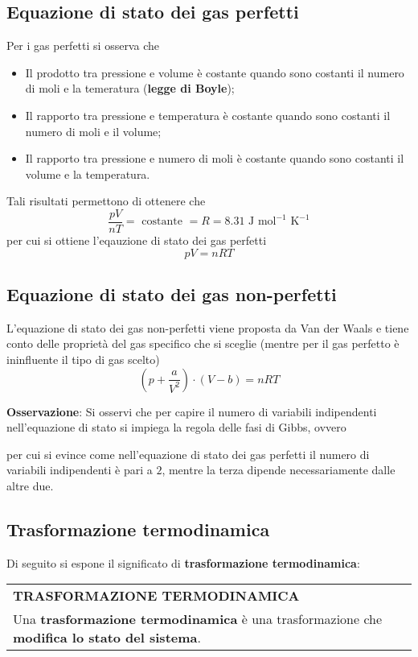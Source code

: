 \documentclass[a4paper]{extarticle}
\renewcommand\arraystretch{}
\begin{document}
\subsection{Equazione di stato dei gas perfetti}
Per i gas perfetti si osserva che
\begin{itemize}
  \item Il prodotto tra pressione e volume è costante quando sono costanti il numero di moli e la temeratura (\textbf{legge di Boyle});
  \item Il rapporto tra pressione e temperatura è costante quando sono costanti il numero di moli e il volume;
  \item Il rapporto tra pressione e numero di moli è costante quando sono costanti il volume e la temperatura.
\end{itemize}
Tali risultati permettono di ottenere che
\[\frac{p V}{n T} = \text{ costante } = R = 8.31 \text{ J mol}^{-1} \text{ K}^{-1}\]
per cui si ottiene l'eqauzione di stato dei gas perfetti
\[\boxed{pV=nRT}\]

\vspace{1em}
\subsection{Equazione di stato dei gas non-perfetti}
L'equazione di stato dei gas non-perfetti viene proposta da Van der Waals e tiene conto delle proprietà del gas specifico che si sceglie (mentre per il gas perfetto è ininfluente il tipo di gas scelto)
\[\boxed{\left(p + \frac{a}{V^2}\right) \cdot \left(V-b\right) = n R T}\]

\vspace{1em}
\noindent
\textbf{Osservazione}: Si osservi che per capire il numero di variabili indipendenti nell'equazione di stato si impiega la regola delle fasi di Gibbs, ovvero

per cui si evince come nell'equazione di stato dei gas perfetti il numero di variabili indipendenti è pari a $2$, mentre la terza dipende necessariamente dalle altre due.

\vspace{1em}
\subsection{Trasformazione termodinamica}
Di seguito si espone il significato di \textbf{trasformazione termodinamica}:

\vspace{1em}
\setlength{\tabcolsep}{14pt}
\renewcommand{\arraystretch}{2}
\noindent
\begin{tabularx}{\textwidth}{@{}|P|@{}}
    \hline
    {\textbf{TRASFORMAZIONE TERMODINAMICA}}\\
    \parbox{\linewidth}{Una \textbf{trasformazione termodinamica} è una trasformazione che \textbf{modifica lo stato del sistema}.\vspace{3mm}}\\
    \hline
\end{tabularx}
\end{document}

